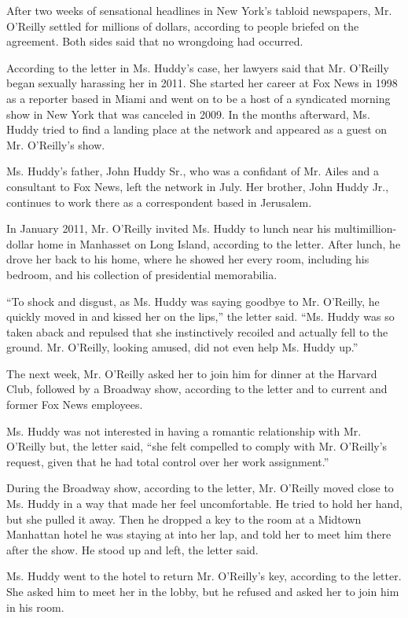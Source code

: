 After two weeks of sensational headlines in New York's tabloid
newspapers, Mr. O'Reilly settled for millions of dollars, according to
people briefed on the agreement. Both sides said that no wrongdoing had
occurred.

According to the letter in Ms. Huddy's case, her lawyers said that Mr.
O'Reilly began sexually harassing her in 2011. She started her career at
Fox News in 1998 as a reporter based in Miami and went on to be a host
of a syndicated morning show in New York that was canceled in 2009. In
the months afterward, Ms. Huddy tried to find a landing place at the
network and appeared as a guest on Mr. O'Reilly's show.

Ms. Huddy's father, John Huddy Sr., who was a confidant of Mr. Ailes and
a consultant to Fox News, left the network in July. Her brother, John
Huddy Jr., continues to work there as a correspondent based in
Jerusalem.

In January 2011, Mr. O'Reilly invited Ms. Huddy to lunch near his
multimillion-dollar home in Manhasset on Long Island, according to the
letter. After lunch, he drove her back to his home, where he showed her
every room, including his bedroom, and his collection of presidential
memorabilia.

``To shock and disgust, as Ms. Huddy was saying goodbye to Mr. O'Reilly,
he quickly moved in and kissed her on the lips,'' the letter said. ``Ms.
Huddy was so taken aback and repulsed that she instinctively recoiled
and actually fell to the ground. Mr. O'Reilly, looking amused, did not
even help Ms. Huddy up.''

The next week, Mr. O'Reilly asked her to join him for dinner at the
Harvard Club, followed by a Broadway show, according to the letter and
to current and former Fox News employees.

Ms. Huddy was not interested in having a romantic relationship with Mr.
O'Reilly but, the letter said, ``she felt compelled to comply with Mr.
O'Reilly's request, given that he had total control over her work
assignment.''

During the Broadway show, according to the letter, Mr. O'Reilly moved
close to Ms. Huddy in a way that made her feel uncomfortable. He tried
to hold her hand, but she pulled it away. Then he dropped a key to the
room at a Midtown Manhattan hotel he was staying at into her lap, and
told her to meet him there after the show. He stood up and left, the
letter said.

Ms. Huddy went to the hotel to return Mr. O'Reilly's key, according to
the letter. She asked him to meet her in the lobby, but he refused and
asked her to join him in his room.

